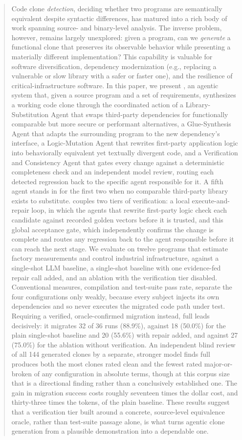 \begin{abstract}
Code clone \emph{detection}, deciding whether two programs are semantically equivalent despite syntactic differences, has matured into a rich body of work spanning source- and binary-level analysis. The inverse problem, however, remains largely unexplored: given a program, can we \emph{generate} a functional clone that preserves its observable behavior while presenting a materially different implementation? This capability is valuable for software diversification, dependency modernization (e.g., replacing a vulnerable or slow library with a safer or faster one), and the resilience of critical-infrastructure software. In this paper, we present \sys, an agentic system that, given a source program and a set of requirements, synthesizes a working code clone through the coordinated action of a Library-Substitution Agent that swaps third-party dependencies for functionally comparable but more secure or performant alternatives, a Glue-Synthesis Agent that adapts the surrounding program to the new dependency's interface, a Logic-Mutation Agent that rewrites first-party application logic into behaviorally equivalent yet textually divergent code, and a Verification and Consistency Agent that gates every change against a deterministic completeness check and an independent model review, routing each detected regression back to the specific agent responsible for it. A fifth agent stands in for the first two when no comparable third-party library exists to substitute. \sys couples two tiers of verification: a local execute-and-repair loop, in which the agents that rewrite first-party logic check each candidate against recorded golden vectors before it is trusted, and this global acceptance gate, which independently confirms the change is complete and routes any regression back to the agent responsible before it can reach the next stage. We evaluate \sys on twelve programs that estimate factory measurements and control industrial infrastructure, against a single-shot LLM baseline, a single-shot baseline with one evidence-fed repair call added, and an ablation with the verification tier disabled. Conventional measures, compilation and test-suite pass rate, separate the four configurations only weakly, because every subject injects its own dependencies and so never executes the migrated code path under test. Requiring a verified, oracle-confirmed migration instead, full \sys leads decisively: it migrates 32 of 36 runs (88.9\%), against 18 (50.0\%) for the plain single-shot baseline and 20 (55.6\%) with repair added, and against 27 (75.0\%) for the ablation without verification. An independent blind review of all 144 generated clones by a separate, stronger model finds full \sys produces both the most clones rated clean and the fewest rated major-or-broken of any configuration in absolute terms, though at this corpus size that is a directional finding rather than a conclusively established one. The gain in migration success costs roughly seventeen times the dollar cost, and thirty-three times the tokens, of the plain baseline. These results suggest that a verification tier built around a concrete, source-level equivalence oracle, rather than test-suite passage alone, is what turns agentic clone generation from a plausible demonstration into a dependable one.

\end{abstract}
